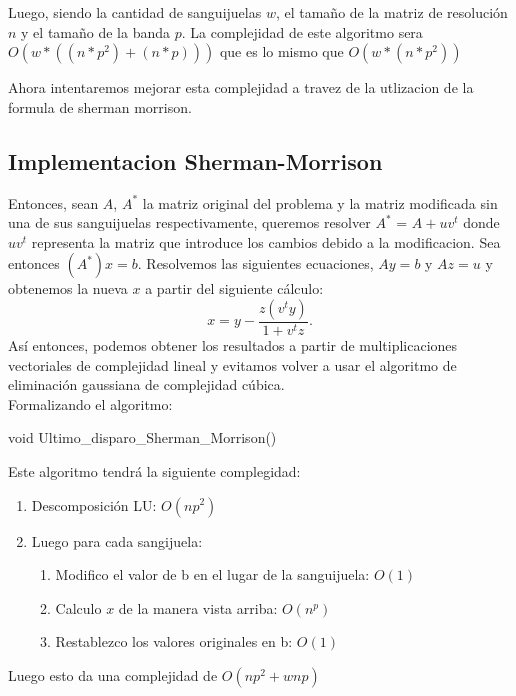 Luego, siendo la cantidad de sanguijuelas $w$, el tamaño de la matriz de resoluci\'on $n$ y el tamaño de la banda $p$. La complejidad de este algoritmo sera $O(w*((n*p^2) + (n*p)) )$ que es lo mismo que $O(w*(n*p^2))$

Ahora intentaremos mejorar esta complejidad a travez de la utlizacion de la formula de sherman morrison.

\subsection{Implementacion Sherman-Morrison}
Entonces, sean $A$, $A^*$ la matriz original del problema y la matriz modificada sin una de sus sanguijuelas respectivamente, queremos resolver $A^*$ = $A + uv^t$ donde $uv^t$ representa la matriz que introduce los cambios debido a la modificacion. Sea entonces
$(A^*)x = b$. Resolvemos las siguientes ecuaciones, $Ay = b$ y $Az = u$ y obtenemos la nueva $x$ a partir del siguiente c\'alculo:
\begin{equation}
x = y - \frac{z(v^ty)}{1+v^tz}.
\end{equation}
As\'i entonces, podemos obtener los resultados a partir de multiplicaciones vectoriales de complejidad lineal y evitamos volver a usar el algoritmo de eliminaci\'on gaussiana de complejidad c\'ubica.
\\
Formalizando el algoritmo:
\begin{algorithm}
\begin{algorithmic}[1]\parskip=1mm
\caption{void Ultimo\_disparo\_Sherman\_Morrison()}
\end{algorithmic}
\end{algorithm}

Este algoritmo tendrá la siguiente complegidad:
\begin{enumerate}
 \item Descomposición LU: $O(np^2)$
 \item Luego para cada sangijuela:
\begin{enumerate}
\item Modifico el valor de b en el lugar de la sanguijuela: $O(1)$
\item Calculo $x$ de la manera vista arriba: $O(n^p)$
\item Restablezco los valores originales en b: $O(1)$
\end{enumerate}  
\end{enumerate}
Luego esto da una complejidad de $O(np^2 + wnp)$